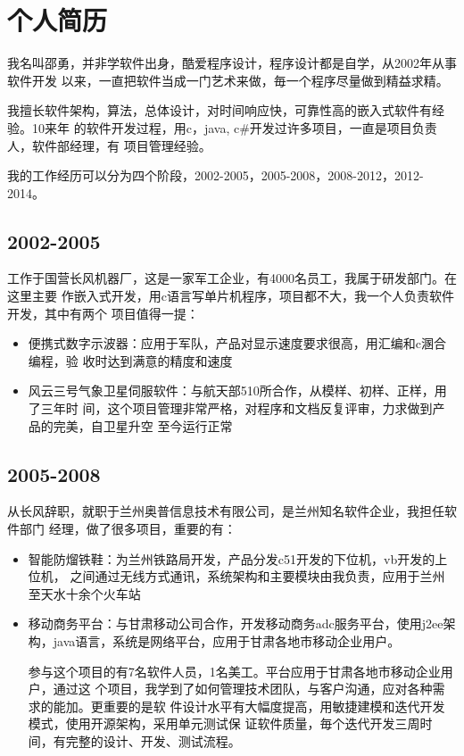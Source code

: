

\section{个人简历}

我名叫邵勇，并非学软件出身，酷爱程序设计，程序设计都是自学，从2002年从事软件开发
以来，一直把软件当成一门艺术来做，毎一个程序尽量做到精益求精。

我擅长软件架构，算法，总体设计，对时间响应快，可靠性高的嵌入式软件有经验。10来年
的软件开发过程，用c，java, c\#开发过许多项目，一直是项目负责人，软件部经理，有
项目管理经验。

我的工作经历可以分为四个阶段，2002-2005，2005-2008，2008-2012，2012-2014。

\subsection{2002-2005}

工作于国营长风机器厂，这是一家军工企业，有4000名员工，我属于研发部门。在这里主要
作嵌入式开发，用c语言写单片机程序，项目都不大，我一个人负责软件开发，其中有两个
项目值得一提：
\begin{itemize}
\item 便携式数字示波器：应用于军队，产品对显示速度要求很高，用汇编和c溷合编程，验
  收时达到满意的精度和速度
\item 风云三号气象卫星伺服软件：与航天部510所合作，从模样、初样、正样，用了三年时
  间，这个项目管理非常严格，对程序和文档反复评审，力求做到产品的完美，自卫星升空
  至今运行正常
\end{itemize}

\subsection{2005-2008}

从长风辞职，就职于兰州奥普信息技术有限公司，是兰州知名软件企业，我担任软件部门
经理，做了很多项目，重要的有：
\begin{itemize}
\item 智能防熘铁鞋：为兰州铁路局开发，产品分发c51开发的下位机，vb开发的上位机，
  之间通过无线方式通讯，系统架构和主要模块由我负责，应用于兰州至天水十余个火车站
\item 移动商务平台：与甘肃移动公司合作，开发移动商务adc服务平台，使用j2ee架
  构，java语言，系统是网络平台，应用于甘肃各地市移动企业用户。

  参与这个项目的有7名软件人员，1名美工。平台应用于甘肃各地市移动企业用户，通过这
  个项目，我学到了如何管理技术团队，与客户沟通，应对各种需求的能加。更重要的是软
  件设计水平有大幅度提高，用敏捷建模和迭代开发模式，使用开源架构，采用单元测试保
  证软件质量，毎个迭代开发三周时间，有完整的设计、开发、测试流程。
\end{itemize}

